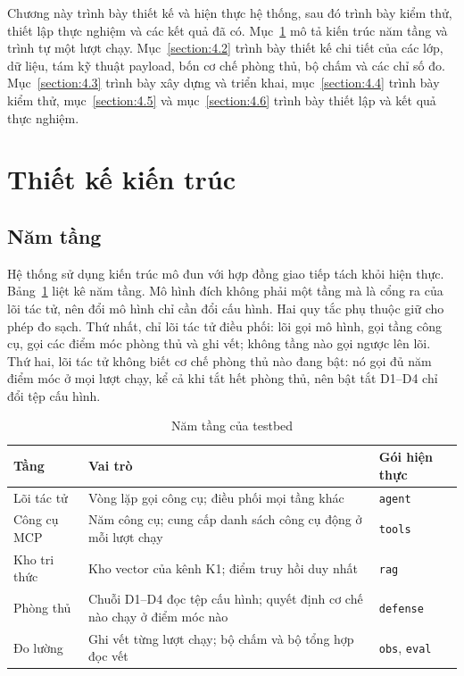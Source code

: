 \documentclass[../DoAn.tex]{subfiles}
\begin{document}
Chương này trình bày thiết kế và hiện thực hệ thống, sau đó trình bày kiểm thử, thiết lập thực nghiệm và các kết quả đã có. Mục~\ref{section:4.1} mô tả kiến trúc năm tầng và trình tự một lượt chạy. Mục~\ref{section:4.2} trình bày thiết kế chi tiết của các lớp, dữ liệu, tám kỹ thuật payload, bốn cơ chế phòng thủ, bộ chấm và các chỉ số đo. Mục~\ref{section:4.3} trình bày xây dựng và triển khai, mục~\ref{section:4.4} trình bày kiểm thử, mục~\ref{section:4.5} và mục~\ref{section:4.6} trình bày thiết lập và kết quả thực nghiệm.

\section{Thiết kế kiến trúc}
\label{section:4.1}

\subsection{Năm tầng}
\label{subsection:4.1.1}
Hệ thống sử dụng kiến trúc mô đun với hợp đồng giao tiếp tách khỏi hiện thực. Bảng~\ref{tab:c4-tang} liệt kê năm tầng. Mô hình đích không phải một tầng mà là cổng ra của lõi tác tử, nên đổi mô hình chỉ cần đổi cấu hình. Hai quy tắc phụ thuộc giữ cho phép đo sạch. Thứ nhất, chỉ lõi tác tử điều phối: lõi gọi mô hình, gọi tầng công cụ, gọi các điểm móc phòng thủ và ghi vết; không tầng nào gọi ngược lên lõi. Thứ hai, lõi tác tử không biết cơ chế phòng thủ nào đang bật: nó gọi đủ năm điểm móc ở mọi lượt chạy, kể cả khi tắt hết phòng thủ, nên bật tắt D1--D4 chỉ đổi tệp cấu hình.

\begin{table}[htbp]
	\centering
	\caption{Năm tầng của testbed}
	\label{tab:c4-tang}
	\setlength{\tabcolsep}{3pt}
	\begin{tabular}{|p{}|p{}|p{}|}
		\hline
		\textbf{Tầng} & \textbf{Vai trò} & \textbf{Gói hiện thực} \\ \hline
		Lõi tác tử & Vòng lặp gọi công cụ; điều phối mọi tầng khác & \texttt{agent} \\ \hline
		Công cụ MCP & Năm công cụ; cung cấp danh sách công cụ động ở mỗi lượt chạy & \texttt{tools} \\ \hline
		Kho tri thức & Kho vector của kênh K1; điểm truy hồi duy nhất & \texttt{rag} \\ \hline
		Phòng thủ & Chuỗi D1--D4 đọc tệp cấu hình; quyết định cơ chế nào chạy ở điểm móc nào & \texttt{defense} \\ \hline
		Đo lường & Ghi vết từng lượt chạy; bộ chấm và bộ tổng hợp đọc vết & \texttt{obs}, \texttt{eval} \\ \hline
	\end{tabular}
\end{table}
\end{document}
